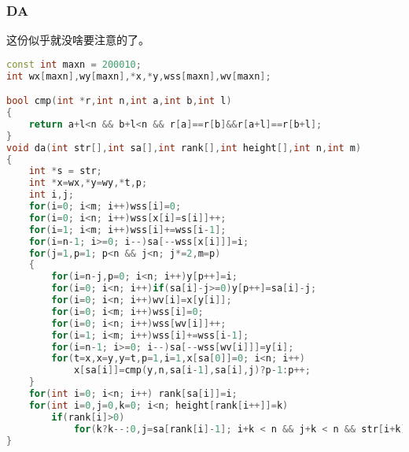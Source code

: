	\subsubsection{DA}
		这份似乎就没啥要注意的了。
		\begin{lstlisting}[language=c++]
const int maxn = 200010;
int wx[maxn],wy[maxn],*x,*y,wss[maxn],wv[maxn];

bool cmp(int *r,int n,int a,int b,int l)
{
	return a+l<n && b+l<n && r[a]==r[b]&&r[a+l]==r[b+l];
}
void da(int str[],int sa[],int rank[],int height[],int n,int m)
{
	int *s = str;
	int *x=wx,*y=wy,*t,p;
	int i,j;
	for(i=0; i<m; i++)wss[i]=0;
	for(i=0; i<n; i++)wss[x[i]=s[i]]++;
	for(i=1; i<m; i++)wss[i]+=wss[i-1];
	for(i=n-1; i>=0; i--)sa[--wss[x[i]]]=i;
	for(j=1,p=1; p<n && j<n; j*=2,m=p)
	{
		for(i=n-j,p=0; i<n; i++)y[p++]=i;
		for(i=0; i<n; i++)if(sa[i]-j>=0)y[p++]=sa[i]-j;
		for(i=0; i<n; i++)wv[i]=x[y[i]];
		for(i=0; i<m; i++)wss[i]=0;
		for(i=0; i<n; i++)wss[wv[i]]++;
		for(i=1; i<m; i++)wss[i]+=wss[i-1];
		for(i=n-1; i>=0; i--)sa[--wss[wv[i]]]=y[i];
		for(t=x,x=y,y=t,p=1,i=1,x[sa[0]]=0; i<n; i++)
			x[sa[i]]=cmp(y,n,sa[i-1],sa[i],j)?p-1:p++;
	}
	for(int i=0; i<n; i++) rank[sa[i]]=i;
	for(int i=0,j=0,k=0; i<n; height[rank[i++]]=k)
		if(rank[i]>0)
			for(k?k--:0,j=sa[rank[i]-1]; i+k < n && j+k < n && str[i+k]==str[j+k]; k++);
}
		\end{lstlisting}